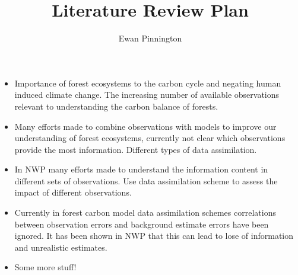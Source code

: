 \documentclass[11pt]{article}
\title{Literature Review Plan}
\author{Ewan Pinnington}
\begin{document}
\maketitle

\begin{itemize}
\item Importance of forest ecosystems to the carbon cycle and negating human induced climate change. The increasing number of available observations relevant to understanding the carbon balance of forests.

\item Many efforts made to combine observations with models to improve our understanding of forest ecosystems, currently not clear which observations provide the most information. Different types of data assimilation.

\item In NWP many efforts made to understand the information content in different sets of observations. Use data assimilation scheme to assess the impact of different observations.

\item Currently in forest carbon model data assimilation schemes correlations between observation errors and background estimate errors have been ignored. It has been shown in NWP that this can lead to lose of information and unrealistic estimates.

\item Some more stuff!


\end{itemize} 
\end{document}
